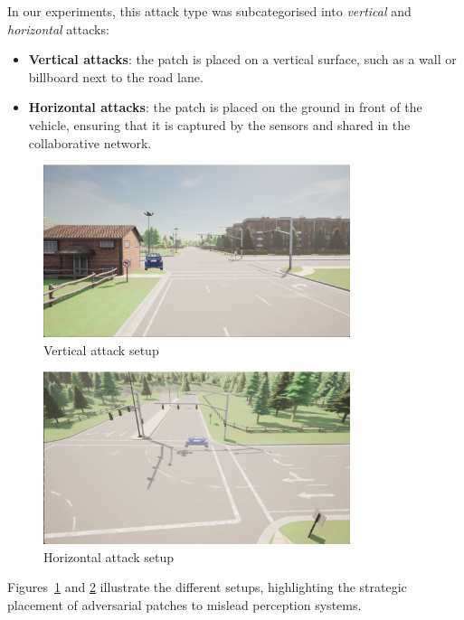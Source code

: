 In our experiments, this attack type was subcategorised into \textit{vertical} and \textit{horizontal} attacks:
\begin{itemize}
    \item \textbf{Vertical attacks}: the patch is placed on a vertical surface, such as a wall or billboard next to the road lane.
    \item \textbf{Horizontal attacks}: the patch is placed on the ground in front of the vehicle, ensuring that it is captured by the sensors and shared in the collaborative network.
\end{itemize}

\begin{figure}[ht]
    \centering
    \includegraphics[width=0.8\textwidth]{figures/attacks_framework/vertical_attack.png}
    \caption{Vertical attack setup}
    \label{fig:vertical_attack}
\end{figure}

\begin{figure}[ht]
    \centering
    \includegraphics[width=0.8\textwidth]{figures/attacks_framework/hori_attack.png}
    \caption{Horizontal attack setup}
    \label{fig:horizontal_attack}
\end{figure}

Figures~\ref{fig:vertical_attack} and \ref{fig:horizontal_attack} illustrate the different setups, highlighting the strategic placement of adversarial patches to mislead perception systems.

